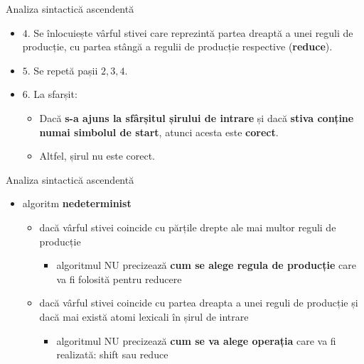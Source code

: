 \documentclass[pdf]{beamer}
\begin{document}
\begin{frame}{Analiza sintactică ascendentă}
\begin{itemize}
\item 
$4.$ Se înlocuiește vârful stivei care reprezintă partea dreaptă a unei reguli de producție, cu partea stângă a regulii de producție respective (\textbf{reduce}).

\item
$5$. Se repetă pașii $2,3,4$.

\item
$6.$ La sfarșit: 
\begin{itemize}
\item
Dacă \textbf{s-a ajuns la sfârșitul șirului de intrare} și dacă \textbf{stiva conține numai simbolul de start}, atunci acesta este \textbf{corect}.
\item
Altfel, șirul nu este corect.
\end{itemize}
\end{itemize}
\end{frame}



\begin{frame}{Analiza sintactică ascendentă}
\begin{itemize}
\item
algoritm \textbf{nedeterminist}

\begin{itemize}
\item
dacă vârful stivei coincide cu părțile drepte ale mai multor reguli de producție
\begin{itemize}
\item
algoritmul NU precizează \textbf{cum se alege regula de producție} care va fi folosită pentru reducere
\end{itemize}
\item
dacă vârful stivei coincide cu partea dreapta a unei reguli de producție și dacă mai există atomi lexicali în șirul de intrare
\begin{itemize}
\item
algoritmul NU precizează \textbf{cum se va alege operația} care va fi realizată: shift sau reduce
\end{itemize}
\end{itemize}
\end{itemize}
\end{frame}
\end{document}
